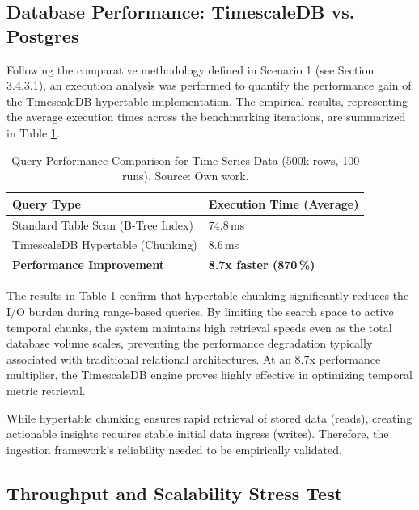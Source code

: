\subsection{Database Performance: TimescaleDB vs. Postgres}

Following the comparative methodology defined in Scenario 1 (see Section 3.4.3.1), an execution analysis was performed to quantify the performance gain of the TimescaleDB hypertable implementation. The empirical results, representing the average execution times across the benchmarking iterations, are summarized in Table \ref{tab:timescaledb_performance}.

\begin{table}[htbp]
    \centering
    \begin{tabular}{@{}ll@{}}
        \toprule
        \textbf{Query Type} & \textbf{Execution Time (Average)} \\ \midrule
        Standard Table Scan (B-Tree Index) & 74.8\,ms \\
        TimescaleDB Hypertable (Chunking) & 8.6\,ms \\ \midrule
        \textbf{Performance Improvement} & \textbf{8.7x faster (870\,\%)} \\ \bottomrule
    \end{tabular}
    \caption{Query Performance Comparison for Time-Series Data (500k rows, 100 runs). Source: Own work.}
    \label{tab:timescaledb_performance}
\end{table}

The results in Table \ref{tab:timescaledb_performance} confirm that hypertable chunking significantly reduces the I/O burden during range-based queries. By limiting the search space to active temporal chunks, the system maintains high retrieval speeds even as the total database volume scales, preventing the performance degradation typically associated with traditional relational architectures. At an 8.7x performance multiplier, the TimescaleDB engine proves highly effective in optimizing temporal metric retrieval.

While hypertable chunking ensures rapid retrieval of stored data (reads), creating actionable insights requires stable initial data ingress (writes). Therefore, the ingestion framework's reliability needed to be empirically validated.

\subsection{Throughput and Scalability Stress Test}

